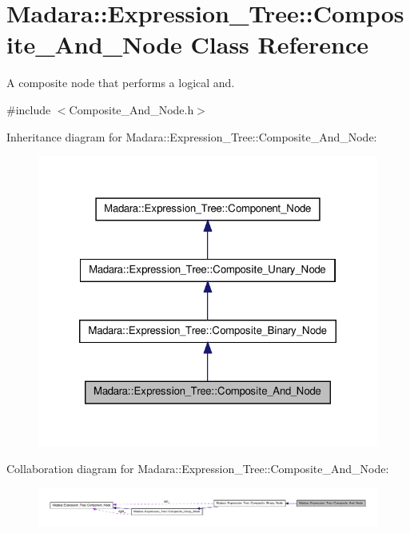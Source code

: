 \hypertarget{classMadara_1_1Expression__Tree_1_1Composite__And__Node}{
\section{Madara::Expression\_\-Tree::Composite\_\-And\_\-Node Class Reference}
\label{dc/ddd/classMadara_1_1Expression__Tree_1_1Composite__And__Node}
}


A composite node that performs a logical and.  




{\ttfamily \#include $<$Composite\_\-And\_\-Node.h$>$}



Inheritance diagram for Madara::Expression\_\-Tree::Composite\_\-And\_\-Node:
\nopagebreak
\begin{figure}[H]
\begin{center}
\leavevmode
\includegraphics[width=322pt]{d8/d68/classMadara_1_1Expression__Tree_1_1Composite__And__Node__inherit__graph}
\end{center}
\end{figure}


Collaboration diagram for Madara::Expression\_\-Tree::Composite\_\-And\_\-Node:
\nopagebreak
\begin{figure}[H]
\begin{center}
\leavevmode
\includegraphics[width=400pt]{d6/dae/classMadara_1_1Expression__Tree_1_1Composite__And__Node__coll__graph}
\end{center}
\end{figure}
